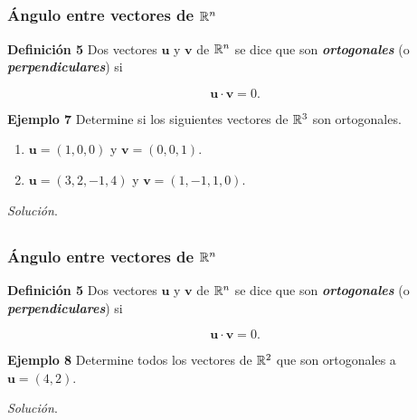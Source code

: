 
\subsection{}

\begin{frame}\frametitle{Ángulo entre vectores de $\mathbb{R}^n$}
	
	\begin{defi}{\textbf{Definición 5}}\justifying
		\justifying
		Dos vectores $\mathbf{u}$ y $\mathbf{v}$ de $\mathbb{R}^n$ se dice que son \textbf{\textit{ortogonales}} (o \textbf{\textit{perpendiculares}}) si 
		
		\vspace{-5mm}
		\[
		\mathbf{u}\cdot \mathbf{v} = 0.
		\]
	\end{defi}	
	
	\begin{ej}{\textbf{Ejemplo 7}}
		Determine si los siguientes vectores de $\mathbb{R}^3$ son ortogonales.
		\begin{enumerate}
			\item[\labelname{$a$}] $\mathbf{u}=(1,0,0)$ y $\mathbf{v}=(0,0,1)$.
			\item[\labelname{$b$}] $\mathbf{u}=(3,2,-1,4)$ y $\mathbf{v}=(1,-1,1,0)$.
		\end{enumerate}		
	\end{ej}	
	\textit{Solución}.
	
\end{frame}



\subsection{}

\begin{frame}\frametitle{Ángulo entre vectores de $\mathbb{R}^n$}

\begin{defi}{\textbf{Definición 5}}\justifying
	\justifying
	Dos vectores $\mathbf{u}$ y $\mathbf{v}$ de $\mathbb{R}^n$ se dice que son \textbf{\textit{ortogonales}} (o \textbf{\textit{perpendiculares}}) si 

	\vspace{-5mm}
	\[
		\mathbf{u}\cdot \mathbf{v} = 0.
	\]
\end{defi}	

\begin{ej}{\textbf{Ejemplo 8}}
	Determine todos los vectores de $\mathbb{R}^2$ que son ortogonales a $\mathbf{u}=(4,2)$.	
\end{ej}
\textit{Solución}.

\end{frame}

